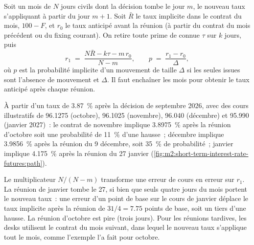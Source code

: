 \begin{method}\label{met:m2:short-term-interest-rate-futures:meeting}
Soit un mois de $N$ jours civils dont la décision tombe le jour $m$, le nouveau taux
s'appliquant à partir du jour $m + 1$. Soit $\bar R$ le taux implicite
dans le contrat du mois, $100 - F$, et $r_0$ le taux anticipé avant la réunion (à partir
du contrat du mois précédent ou du fixing courant). On retire toute prime de 
connue $\tau$ sur $k$ jours, puis
\[
r_1 \;=\; \frac{N\bar R - k\tau - m\,r_0}{N - m},
\qquad
p \;=\; \frac{r_1 - r_0}{\Delta},
\]
où $p$ est la probabilité implicite d'un mouvement de taille $\Delta$ si les seules
issues sont l'absence de mouvement et $\Delta$. Il faut enchaîner les mois pour obtenir le taux
anticipé après chaque réunion.
\end{method}

\begin{example}\label{ex:m2:short-term-interest-rate-futures:path}
À partir d'un taux de 3.87~\% après la décision de septembre 2026, avec des cours illustratifs
de 96.1275 (octobre), 96.1025 (novembre), 96.040 (décembre) et 95.990
(janvier 2027)~: le contrat de novembre implique 3.8975~\% après la réunion d'octobre
soit une probabilité de 11~\% d'une hausse~; décembre implique 3.9856~\% après la réunion du 9
décembre, soit 35~\% de probabilité~; janvier implique 4.175~\% après la réunion du 27 janvier
(\cref{fig:m2:short-term-interest-rate-futures:path}).
\end{example}

\begin{remark}\label{rem:m2:short-term-interest-rate-futures:fragile}
Le multiplicateur $N/(N - m)$ transforme une erreur de cours en erreur sur $r_1$. La
réunion de janvier tombe le 27, si bien que seuls quatre jours du mois portent
le nouveau taux~: une erreur d'un point de base sur le cours de janvier déplace le taux
implicite après la réunion de $31/4 = 7.75$ points de base, soit un tiers d'une hausse. La réunion d'octobre
est pire (trois jours). Pour les réunions tardives, les desks utilisent le contrat du mois suivant,
dans lequel le nouveau taux s'applique tout le mois, comme l'exemple l'a fait pour
octobre.
\end{remark}

